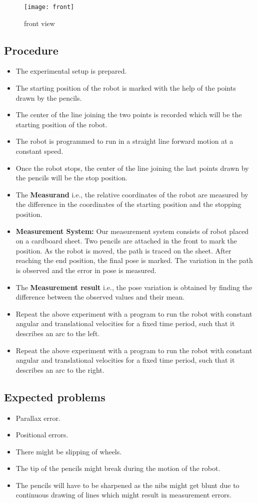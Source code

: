 \documentclass[11pt,a4paper]{article}
\begin{document}
\begin{figure}[H]
\centering
  \centering
  \texttt{[image: front]}
  \caption{front view}
  \label{fig:front}
\end{figure}

\newpage
\subsection{\textbf{Procedure}}
\begin{itemize}
\item The experimental setup is prepared.
\item The starting position of the robot is marked with the help of the points drawn by the pencils.
\item The center of the line joining the two points is recorded which will be the starting position of the robot.
\item The robot is programmed to run in a straight line forward motion at a constant speed.
\item Once the robot stops, the center of the line joining the last points drawn by the pencils will be the stop position.
\item The \textbf{Measurand} i.e., the relative coordinates of the robot are measured by the difference in the coordinates of the starting position and the stopping position.
\item \textbf{Measurement System:} Our measurement system consists of robot placed on a cardboard sheet. Two pencils are attached in the front to mark the position. As the robot is moved, the path is traced on the sheet. After reaching the end position, the final pose is marked. The variation in the path is observed and the error in pose is measured.
\item The \textbf{Measurement result} i.e., the pose variation is obtained by finding the difference between the observed values and their mean.
\item Repeat the above experiment with a program to run the robot with constant angular and translational velocities for a fixed time period, such that it describes an arc to the left.
\item Repeat the above experiment with a program to run the robot with constant angular and translational velocities for a fixed time period, such that it describes an arc to the right.
\end{itemize}

\subsection{\textbf{Expected problems}}
\begin{itemize}
\item Parallax error.
\item Positional errors.
\item There might be slipping of wheels.
\item The tip of the pencils might break during the motion of the robot.
\item The pencils will have to be sharpened as the nibs might get blunt due to continuous drawing of lines which might result in measurement errors.
\end{itemize}
\end{document}
